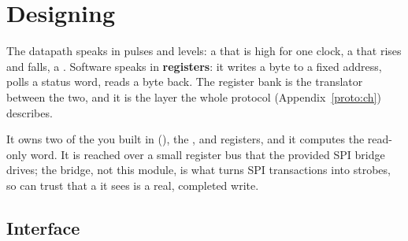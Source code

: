 
\section{Designing }
\label{c5:sec:uart_regs}\label{c5:app:a}
The datapath speaks in pulses and levels: a  that is high for one clock, a 
that rises and falls, a . Software speaks in \textbf{registers}: it writes a byte to a
fixed address, polls a status word, reads a byte back. The register bank is the translator between
the two, and it is the layer the whole protocol (Appendix~\ref{proto:ch}) describes.

It owns two of the  you built in  (), the ,
 and  registers, and it computes the read-only  word.
It is reached over a small register bus that the provided SPI bridge drives; the bridge, not this
module, is what turns SPI transactions into  strobes, so  can trust
that a  it sees is a real, completed write.

\subsection{Interface}
\label{c5:sec:uart_regs_interface}


